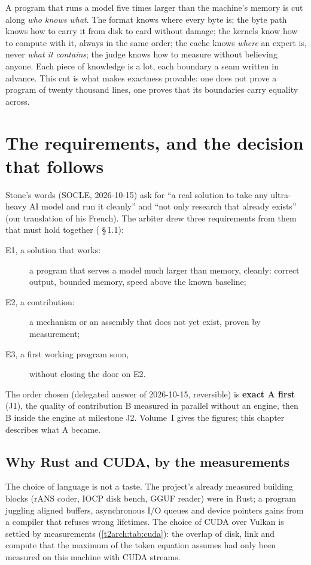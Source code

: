 \begin{enbref}
A program that runs a model five times larger than the machine's memory is cut along \emph{who knows what}. The format knows where every byte is; the byte path knows how to carry it from disk to card without damage; the kernels know how to compute with it, always in the same order; the cache knows \emph{where} an expert is, never \emph{what it contains}; the judge knows how to measure without believing anyone. Each piece of knowledge is a lot, each boundary a seam written in advance. This cut is what makes exactness provable: one does not prove a program of twenty thousand lines, one proves that its boundaries carry equality across.
\end{enbref}

\section{The requirements, and the decision that follows}\label{t2arch:sec:exigences}

Stone's words (SOCLE, 2026-10-15) ask for ``a real solution to take any ultra-heavy AI model and run it cleanly'' and ``not only research that already exists'' (our translation of his French). The arbiter drew three requirements from them that must hold together ( §\,1.1):
\begin{description}
\item[E1, a solution that works:] a program that serves a model much larger than memory, cleanly: correct output, bounded memory, speed above the known baseline;
\item[E2, a contribution:] a mechanism or an assembly that does not yet exist, proven by measurement;
\item[E3, a first working program soon,] without closing the door on E2.
\end{description}
The order chosen (delegated answer of 2026-10-15, reversible) is \textbf{exact A first} (J1), the quality of contribution B measured in parallel without an engine, then B inside the engine at milestone J2. Volume~I gives the figures; this chapter describes what A became.

\subsection{Why Rust and CUDA, by the measurements}

The choice of language is not a taste. The project's already measured building blocks (rANS coder, IOCP disk bench, GGUF reader) were in Rust; a program juggling aligned buffers, asynchronous I/O queues and device pointers gains from a compiler that refuses wrong lifetimes. The choice of CUDA over Vulkan is settled by measurements (\cref{t2arch:tab:cuda}): the overlap of disk, link and compute that the maximum of the token equation assumes had only been measured on this machine with CUDA streams.

